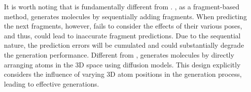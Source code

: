 %
It is worth noting that \method is fundamentally different from \squid.
%
%
\squid, as a fragment-based method, generates molecules by sequentially adding fragments. 
%
When predicting the next fragments, however, \squid fails to consider the effects of their various poses, and thus, could lead to inaccurate fragment predictions.
%
Due to the sequential nature, the prediction errors will be cumulated and could substantially degrade the generation performance.
%
Different from \squid, \method generates molecules by directly arranging atoms in the 3D space using diffusion models.
%
This design explicitly considers the influence of varying 3D atom positions in the generation process, leading to effective generations. 
%
%
%
%
%
%
